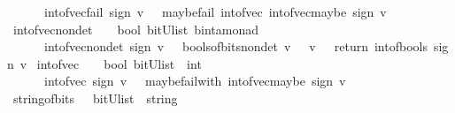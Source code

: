 \begin{isabellebody}
\ \ \ \ \ {\isachardoublequoteopen}\ int{\isacharunderscore}of{\isacharunderscore}vec{\isacharunderscore}fail\ sign\ v\ {\isacharequal}\ {\isacharparenleft}\ maybe{\isacharunderscore}fail\ {\isacharparenleft}{\isacharprime}{\isacharprime}int{\isacharunderscore}of{\isacharunderscore}vec{\isacharprime}{\isacharprime}{\isacharparenright}\ {\isacharparenleft}int{\isacharunderscore}of{\isacharunderscore}vec{\isacharunderscore}maybe\ sign\ v{\isacharparenright}{\isacharparenright}{\isachardoublequoteclose}\isanewline
\isanewline
{}\isamarkupfalse%
\ int{\isacharunderscore}of{\isacharunderscore}vec{\isacharunderscore}nondet\ \ {\isacharcolon}{\isacharcolon}\ {\isachardoublequoteopen}\ bool\ {\isasymRightarrow}{\isacharparenleft}bitU{\isacharparenright}list\ {\isasymRightarrow}{\isacharparenleft}{\isacharprime}b{\isacharcomma}{\isacharparenleft}int{\isacharparenright}{\isacharcomma}{\isacharprime}a{\isacharparenright}monad\ {\isachardoublequoteclose}\ \ \ \isanewline
\ \ \ \ \ {\isachardoublequoteopen}\ int{\isacharunderscore}of{\isacharunderscore}vec{\isacharunderscore}nondet\ sign\ v\ {\isacharequal}\ {\isacharparenleft}\ bools{\isacharunderscore}of{\isacharunderscore}bits{\isacharunderscore}nondet\ v\ {\isasymbind}\ {\isacharparenleft}{\isasymlambda}\ v\ {\isachardot}\ \ return\ {\isacharparenleft}int{\isacharunderscore}of{\isacharunderscore}bools\ sign\ v{\isacharparenright}{\isacharparenright}{\isacharparenright}{\isachardoublequoteclose}\isanewline
\isanewline
{}\isamarkupfalse%
\ int{\isacharunderscore}of{\isacharunderscore}vec\ \ {\isacharcolon}{\isacharcolon}\ {\isachardoublequoteopen}\ bool\ {\isasymRightarrow}{\isacharparenleft}bitU{\isacharparenright}list\ {\isasymRightarrow}\ int\ {\isachardoublequoteclose}\ \ \ \isanewline
\ \ \ \ \ {\isachardoublequoteopen}\ int{\isacharunderscore}of{\isacharunderscore}vec\ sign\ v\ {\isacharequal}\ {\isacharparenleft}\ maybe{\isacharunderscore}failwith\ {\isacharparenleft}int{\isacharunderscore}of{\isacharunderscore}vec{\isacharunderscore}maybe\ sign\ v{\isacharparenright}{\isacharparenright}{\isachardoublequoteclose}\isanewline
\isanewline
\isanewline
%
\isanewline
{}\isamarkupfalse%
\ string{\isacharunderscore}of{\isacharunderscore}bits\ \ {\isacharcolon}{\isacharcolon}\ {\isachardoublequoteopen}{\isacharparenleft}bitU{\isacharparenright}list\ {\isasymRightarrow}\ string\ {\isachardoublequoteclose}\ \ \ \isanewline

\end{isabellebody}

